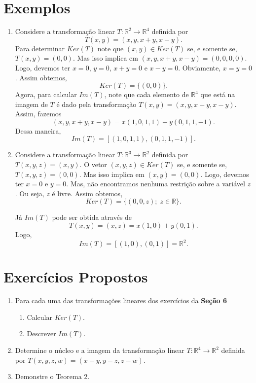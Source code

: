 \section{Exemplos}
\begin{enumerate}
\item Considere a transformação linear $T: \mathbb{R}^2 \rightarrow \mathbb{R}^4$ definida por $$T(x,y)=(x, y,x+y, x-y).$$  Para determinar  $Ker(T)$  note que  $(x,y) \in Ker(T)$ se, e somente se, $T(x,y)=(0,0)$. Mas isso implica em $(x, y, x+y, x-y)=(0,0,0,0)$. Logo, devemos ter $x=0$, $y=0$, $x+y=0$ e $x-y=0$. Obviamente, $x=y=0$. Assim obtemos,  $$Ker(T)=\{(0,0)\}.$$ Agora, para calcular $Im(T)$, note que cada elemento de $\mathbb{R}^4$ que está na imagem de $T$ é dado pela transformação $T(x,y)=(x, y, x+y, x-y)$.  Assim, fazemos $$(x,y,x+y, x-y)=x(1,0,1,1)+y(0,1,1,-1).$$ Dessa maneira, $$Im(T)=[(1,0,1,1),(0,1,1,-1)].$$

\item Considere a  transformação linear $T: \mathbb{R}^3 \rightarrow \mathbb{R}^2$ definida por $T(x,y,z)=(x, y)$. O vetor $(x,y,z) \in Ker(T)$ se, e somente se, $T(x,y,z)=(0,0)$. Mas isso implica em $(x, y)=(0,0)$. Logo, devemos ter $x=0$ e $y=0$. Mas, não encontramos nenhuma restrição sobre a variável  $z$. Ou seja, $z$ é  livre. Assim obtemos,  $$Ker(T)=\{(0,0, z); \; z \in \mathbb{R}\}.$$

Já $Im(T)$ pode ser obtida através de $$T(x, y)=(x,z)=x(1,0)+y(0,1).$$ Logo, $$Im(T)=[(1,0), (0,1)]=\mathbb{R}^2.$$
\end{enumerate}

\section{Exercícios Propostos}
\begin{enumerate}
\item  Para cada uma das transformações lineares dos exercícios da \textbf{Seção 6}
\begin{enumerate}[label=(\alph*)]
\item Calcular $Ker(T)$.
\item Descrever $Im(T)$.
\end{enumerate}
\item Determine o núcleo e a imagem da transformação linear $T: \mathbb{R}^4 \rightarrow \mathbb{R}^2$ definida  por $T(x,y,z,w)=(x-y, y-z, z-w)$.

\item Demonstre o Teorema 2.
\end{enumerate}

